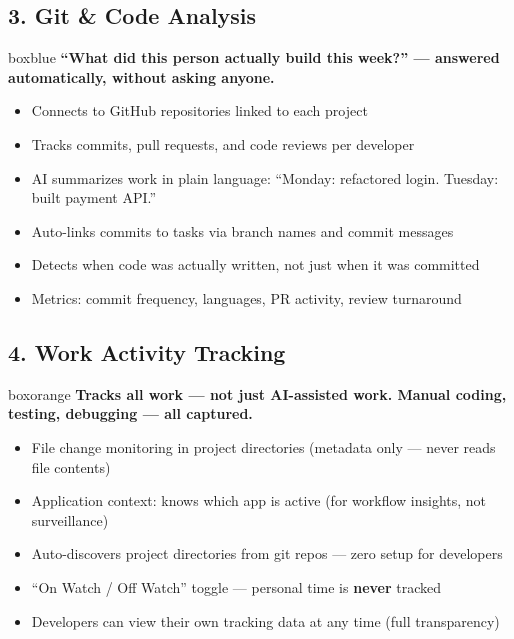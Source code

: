 \documentclass[12pt,a4paper]{article}
\begin{document}
\subsection{3. Git \& Code Analysis}

\begin{hookbox}{boxblue}
\textbf{``What did this person actually build this week?'' --- answered automatically, without asking anyone.}
\end{hookbox}

\begin{itemize}[nosep]
    \item Connects to GitHub repositories linked to each project
    \item Tracks commits, pull requests, and code reviews per developer
    \item AI summarizes work in plain language: ``Monday: refactored login. Tuesday: built payment API.''
    \item Auto-links commits to tasks via branch names and commit messages
    \item Detects when code was actually written, not just when it was committed
    \item Metrics: commit frequency, languages, PR activity, review turnaround
\end{itemize}

\subsection{4. Work Activity Tracking}

\begin{hookbox}{boxorange}
\textbf{Tracks all work --- not just AI-assisted work. Manual coding, testing, debugging --- all captured.}
\end{hookbox}

\begin{itemize}[nosep]
    \item File change monitoring in project directories (metadata only --- never reads file contents)
    \item Application context: knows which app is active (for workflow insights, not surveillance)
    \item Auto-discovers project directories from git repos --- zero setup for developers
    \item ``On Watch / Off Watch'' toggle --- personal time is \textbf{never} tracked
    \item Developers can view their own tracking data at any time (full transparency)
\end{itemize}
\end{document}
